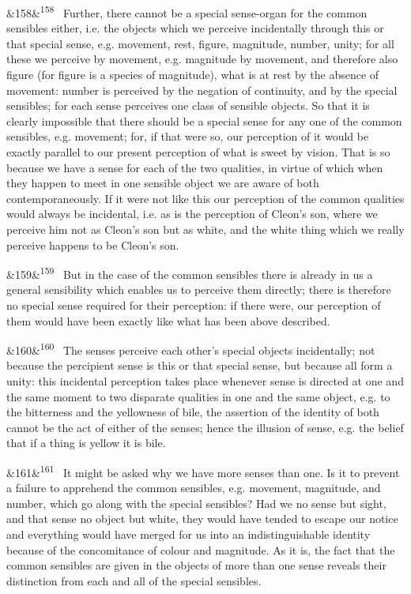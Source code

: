 \documentclass[12pt]{article}
\newcommand{\para}[1][]{\par\noindent\ifx&#1&\else\textsuperscript{\footnotesize #1}~\fi}
\begin{document}
\para[158] Further, there cannot be a special sense-organ for the common sensibles either, i.e. the objects which we perceive incidentally through this or that special sense, e.g. movement, rest, figure, magnitude, number, unity; for all these we perceive by movement, e.g. magnitude by movement, and therefore also figure (for figure is a species of magnitude), what is at rest by the absence of movement: number is perceived by the negation of continuity, and by the special sensibles; for each sense perceives one class of sensible objects. So that it is clearly impossible that there should be a special sense for any one of the common sensibles, e.g. movement; for, if that were so, our perception of it would be exactly parallel to our present perception of what is sweet by vision. That is so because we have a sense for each of the two qualities, in virtue of which when they happen to meet in one sensible object we are aware of both contemporaneously. If it were not like this our perception of the common qualities would always be incidental, i.e. as is the perception of Cleon's son, where we perceive him not as Cleon's son but as white, and the white thing which we really perceive happens to be Cleon's son.

\para[159] But in the case of the common sensibles there is already in us a general sensibility which enables us to perceive them directly; there is therefore no special sense required for their perception: if there were, our perception of them would have been exactly like what has been above described.

\para[160] The senses perceive each other's special objects incidentally; not because the percipient sense is this or that special sense, but because all form a unity: this incidental perception takes place whenever sense is directed at one and the same moment to two disparate qualities in one and the same object, e.g. to the bitterness and the yellowness of bile, the assertion of the identity of both cannot be the act of either of the senses; hence the illusion of sense, e.g. the belief that if a thing is yellow it is bile.

\para[161] It might be asked why we have more senses than one. Is it to prevent a failure to apprehend the common sensibles, e.g. movement, magnitude, and number, which go along with the special sensibles? Had we no sense but sight, and that sense no object but white, they would have tended to escape our notice and everything would have merged for us into an indistinguishable identity because of the concomitance of colour and magnitude. As it is, the fact that the common sensibles are given in the objects of more than one sense reveals their distinction from each and all of the special sensibles.
\end{document}
